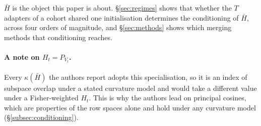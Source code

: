 $\bar H$ is the object this paper is about. \S\ref{sec:regimes} shows that
whether the $T$ adapters of a cohort shared one initialisation determines the
conditioning of $\bar H$, across four orders of magnitude, and
\S\ref{sec:methods} shows which merging methods that conditioning reaches.

\paragraph{A note on $H_t = P_{V_t}$.} Every $\kappa(\bar H)$ the authors report adopts
this specialisation, so it is an index of subspace overlap under a stated
curvature model and would take a different value under a Fisher-weighted
$H_t$. This is why the authors lead on principal cosines, which are properties of the
row spaces alone and hold under any curvature model
(\S\ref{subsec:conditioning}).
